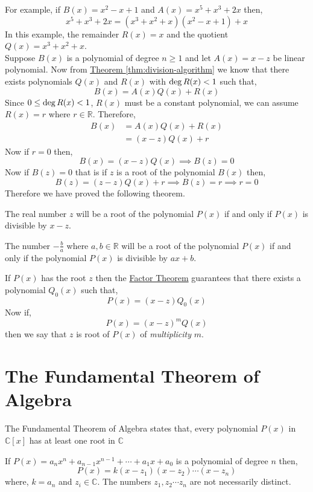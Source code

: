 For example, if $B(x)= x^{2}-x+1$ and $A(x)=x^{5}+x^{3}+2x$ then,
\[
    x^{5}+x^{3}+2x = \left(x^{3}+x^{2}+x\right) \left(x^{2}-x+1\right) +x
\]
In this example, the remainder $R(x)=x$ and the quotient $Q(x)=x^{3}+x^{2}+x$. \\
Suppose $B(x)$ is a polynomial of degree $n\geq 1$ and let $A(x)=x-z$ be linear polynomial. Now from 
\hyperref[thm:division-algorithm]{Theorem \ref{thm:division-algorithm}} we know that there exists polynomials 
$Q(x)$ and $R(x)$ with $\operatorname{deg} R(x) < 1$ such that,
\[
    B(x) = A(x)Q(x) + R(x)
\]
Since $0 \leq \operatorname{deg} R(x) < 1$, $R(x)$ must be a constant polynomial, we can assume $R(x)=r$ where $r \in \mathbb{R}$. 
Therefore,
\begin{align*}
    B(x) &= A(x)Q(x) + R(x) \\
         &= (x - z)Q(x) + r
\end{align*}
Now if $r=0$ then,
\[
    B(x) = (x-z)Q(x) \implies B\left(z\right) = 0
\]
Now if $B\left(z\right)=0$ that is if $z$ is a root of the polynomial $B(x)$ then,
\[
    B\left(z\right) = \left(z - z\right)Q(x) + r \implies B\left(z\right)=r \implies 
    r=0
\]
Therefore we have proved the following theorem.
\begin{theorem}\label{thm:factor-theorem}
    The real number $z$ will be a root of the polynomial $P(x)$ if and only if $P(x)$ is divisible by $x-z$.
\end{theorem}
\begin{corollary}
    The number $-\frac{b}{a}$ where $a, b\in \mathbb{R}$ will be a root of the polynomial $P(x)$ if and only if the 
    polynomial $P(x)$ is divisible by $ax+b$.
\end{corollary}
If $P(x)$ has the root $z$ then the \hyperref[thm:factor-theorem]{Factor Theorem} guarantees that there exists a polynomial 
$Q_{0}(x)$ such that,
\[
    P(x) = \left(x - z\right)Q_{0}(x)
\]
Now if,
\[
    P(x) = \left(x-z\right)^{m}Q(x)
\]
then we say that $z$ is root of $P(x)$ of \textit{multiplicity} $m$.

\section{The Fundamental Theorem of Algebra}

\begin{theorem}\label{thm:fta}
    The Fundamental Theorem of Algebra states that, every polynomial $P(x)$ in $\mathbb{C}[x]$ has at least 
    one root in $\mathbb{C}$
\end{theorem}
\begin{corollary}
    If $P(x) = a_{n}x^{n} + a_{n-1}x^{n-1} + \cdots + a_{1}x + a_{0}$ is a polynomial of degree $n$ then,
    \[
        P(x) = k(x - z_{1})(x - z_{2})\cdots (x - z_{n})
    \]
    where, $k = a_{n}$ and $z_{i} \in \mathbb{C}$. The numbers $z_{1},z_{2}\cdots z_{n}$ are not necessarily 
    distinct.
\end{corollary}

